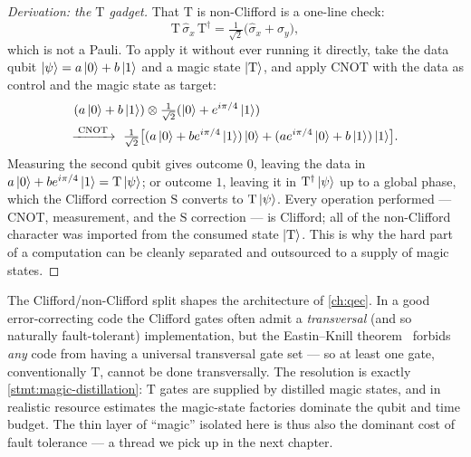 \begin{proof}[Derivation: the $\mathrm{T}$ gadget]
That $\mathrm{T}$ is non-Clifford is a one-line check:
\begin{equation}
\mathrm{T}\,\hat\sigma_x\,\mathrm{T}^\dagger
=\tfrac{1}{\sqrt2}\bigl(\hat\sigma_x+\hat\sigma_y\bigr),
\end{equation}
which is not a Pauli. To apply it without ever running it directly, take
the data qubit $\ket{\psi}=a\ket{0}+b\ket{1}$ and a magic state
$\ket{\mathrm{T}}$, and apply $\mathrm{CNOT}$ with the data as control
and the magic state as target:
\begin{equation}
\begin{aligned}
(a\ket{0}+b\ket{1})&\otimes\tfrac{1}{\sqrt2}(\ket{0}+e^{i\pi/4}\ket{1})\\
\xrightarrow{\;\mathrm{CNOT}\;}\ \tfrac{1}{\sqrt2}\bigl[
&(a\ket{0}+be^{i\pi/4}\ket{1})\ket{0}
+(ae^{i\pi/4}\ket{0}+b\ket{1})\ket{1}\bigr].
\end{aligned}
\end{equation}
Measuring the second qubit gives outcome $0$, leaving the data in
$a\ket{0}+be^{i\pi/4}\ket{1}=\mathrm{T}\ket{\psi}$; or outcome $1$,
leaving it in $\mathrm{T}^\dagger\ket{\psi}$ up to a global phase, which
the Clifford correction $\mathrm{S}$ converts to $\mathrm{T}\ket{\psi}$.
Every operation performed --- CNOT, measurement, and the $\mathrm{S}$
correction --- is Clifford; all of the non-Clifford character was
imported from the consumed state $\ket{\mathrm{T}}$. This is why the
hard part of a computation can be cleanly separated and outsourced to a
supply of magic states.
\end{proof}

\begin{application}
\label{app:magic-cost}
The Clifford/non-Clifford split shapes the architecture of
\cref{ch:qec}. In a good error-correcting code the Clifford gates often
admit a \emph{transversal} (and so naturally fault-tolerant)
implementation, but the Eastin--Knill theorem~\cite{eastin2009}
forbids \emph{any} code from having a universal transversal gate set ---
so at least one gate, conventionally $\mathrm{T}$, cannot be done
transversally. The resolution is exactly \cref{stmt:magic-distillation}:
$\mathrm{T}$ gates are supplied by distilled magic states, and in
realistic resource estimates the magic-state factories dominate the
qubit and time budget. The thin layer of ``magic'' isolated here is thus
also the dominant cost of fault tolerance --- a thread we pick up in the
next chapter.
\end{application}

